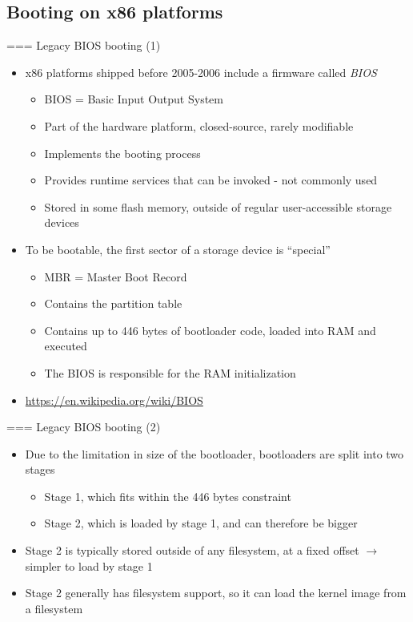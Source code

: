 \subsection{Booting on x86 platforms}

=== {Legacy BIOS booting (1)}
  \begin{itemize}
  \item x86 platforms shipped before 2005-2006 include a firmware
    called {\em BIOS}
    \begin{itemize}
    \item BIOS = Basic Input Output System
    \item Part of the hardware platform, closed-source, rarely
      modifiable
    \item Implements the booting process
    \item Provides runtime services that can be invoked - not commonly
      used
    \item Stored in some flash memory, outside of regular
      user-accessible storage devices
    \end{itemize}
  \item To be bootable, the first sector of a storage device is
    ``special''
    \begin{itemize}
    \item MBR = Master Boot Record
    \item Contains the partition table
    \item Contains up to 446 bytes of bootloader code, loaded into RAM
      and executed
    \item The BIOS is responsible for the RAM initialization
    \end{itemize}
  \item \url{https://en.wikipedia.org/wiki/BIOS}
  \end{itemize}


=== {Legacy BIOS booting (2)}
  \begin{itemize}
  \item Due to the limitation in size of the bootloader, bootloaders
    are split into two stages
    \begin{itemize}
    \item Stage 1, which fits within the 446 bytes constraint
    \item Stage 2, which is loaded by stage 1, and can therefore be
      bigger
    \end{itemize}
  \item Stage 2 is typically stored outside of any filesystem, at a
    fixed offset $\rightarrow$ simpler to load by stage 1
  \item Stage 2 generally has filesystem support, so it can load the
    kernel image from a filesystem
  \end{itemize}


